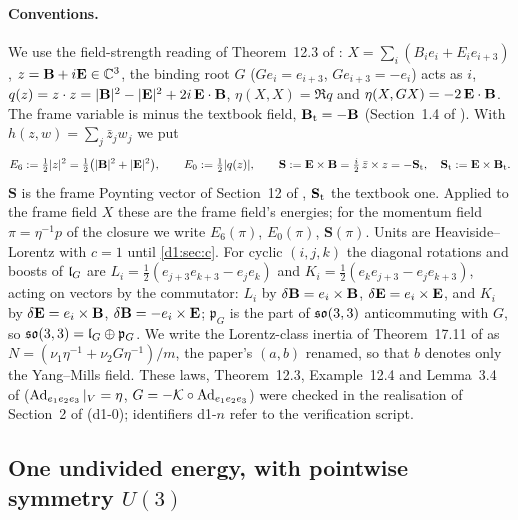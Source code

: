 \paragraph{Conventions.} We use the field-strength reading of Theorem~12.3 of \cite{ES17}: $X=\sum_i(B_ie_i+E_ie_{i+3})$, $z=\mathbf B+i\mathbf E\in\mathbb{C}^3$,
the binding root $G$ ($Ge_i=e_{i+3}$, $Ge_{i+3}=-e_i$) acts as $i$, $q(z)=z\cdot z=|\mathbf B|^2-|\mathbf E|^2+2i\,\mathbf E\cdot\mathbf B$, $\eta(X,X)=\Re q$ and
$\eta(X,GX)=-2\,\mathbf E\cdot\mathbf B$. The frame variable is minus the textbook field, $\mathbf B_{\rm t}=-\mathbf B$ (Section~1.4 of \cite{ES17}). With
$h(z,w)=\sum_j\bar z_jw_j$ we put
\begin{equation}
\label{d1:eq:defs}
E_6:=\tfrac12|z|^2=\tfrac12\bigl(|\mathbf B|^2+|\mathbf E|^2\bigr),\qquad E_0:=\tfrac12|q(z)|,\qquad
\mathbf S:=\mathbf E\times\mathbf B=\tfrac i2\,\bar z\times z=-\mathbf S_{\rm t},\quad \mathbf S_{\rm t}:=\mathbf E\times\mathbf B_{\rm t} .
\end{equation}
$\mathbf S$ is the frame Poynting vector of Section~12 of \cite{ES17}, $\mathbf S_{\rm t}$ the textbook one. Applied to the frame field $X$ these are
the frame field's energies; for the momentum field $\pi=\eta^{-1}p$ of the closure we write $E_6(\pi)$, $E_0(\pi)$, $\mathbf S(\pi)$. Units are
Heaviside--Lorentz with $c=1$ until \cref{d1:sec:c}. For cyclic $(i,j,k)$ the diagonal
rotations and boosts of $\mathfrak l_G$ are $L_i=\tfrac12(e_{j+3}e_{k+3}-e_je_k)$ and $K_i=\tfrac12(e_ke_{j+3}-e_je_{k+3})$, acting on vectors by the
commutator: $L_i$ by $\delta\mathbf B=e_i\times\mathbf B$, $\delta\mathbf E=e_i\times\mathbf E$, and $K_i$ by $\delta\mathbf E=e_i\times\mathbf B$, $\delta\mathbf B=-e_i\times\mathbf E$; $\mathfrak p_G$ is
the part of $\mathfrak{so}(3,3)$ anticommuting with $G$, so $\mathfrak{so}(3,3)=\mathfrak l_G\oplus\mathfrak p_G$. We write the Lorentz-class inertia of
Theorem~17.11 of \cite{ES17} as $N=(\nu_1\eta^{-1}+\nu_2G\eta^{-1})/m$, the paper's $(a,b)$ renamed, so that $b$ denotes only the
Yang--Mills field. These laws, Theorem~12.3, Example~12.4 and Lemma~3.4 of \cite{ES17} ($\operatorname{Ad}_{e_1e_2e_3}|_V=\eta$, $G=-\mathcal K\circ\operatorname{Ad}_{e_1e_2e_3}$) were
checked in the realisation of Section~2 of \cite{ES17} (d1-0); identifiers d1-$n$ refer to the verification script.

\subsection{\texorpdfstring{One undivided energy, with pointwise symmetry $U(3)$}{One undivided energy, with pointwise symmetry U(3)}}
\label{d1:sec:unique}

